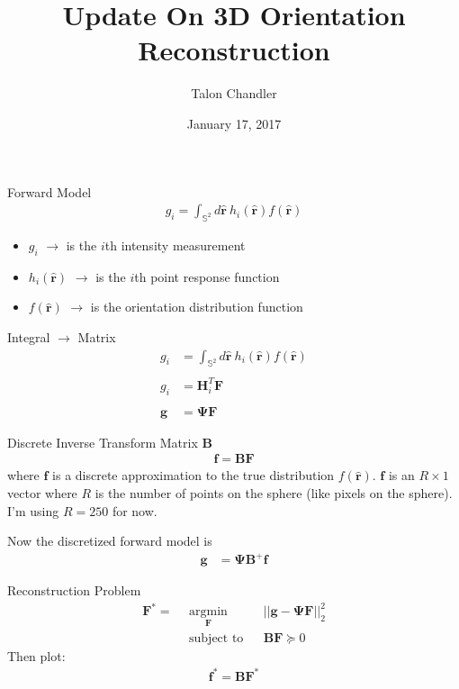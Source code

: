 \documentclass[presentation]{beamer}
\author{Talon Chandler}
\date{January 17, 2017}
\title{Update On 3D Orientation Reconstruction}
\begin{document}
\maketitle
\begin{frame}[label=sec-1]{Forward Model}
\begin{align*}
g_i = \int_{\mathbb{S}^2}d\hat{\textbf{r}}\ h_i(\hat{\textbf{r}})f(\hat{\textbf{r}})
\end{align*}
\begin{itemize}
\item $g_i$ $\rightarrow$ is the $i$th intensity measurement
\item $h_i(\hat{\textbf{r}})$ $\rightarrow$ is the $i$th point response function
\item $f(\hat{\textbf{r}})$ $\rightarrow$ is the orientation distribution function
\end{itemize}
\end{frame}

\begin{frame}{Integral $\rightarrow$ Matrix}
  \begin{align*}
  g_i &= \int_{\mathbb{S}^2}d\hat{\textbf{r}}\ h_i(\hat{\textbf{r}})f(\hat{\textbf{r}})\\ \\
  g_i &= \textbf{H}_i^T\textbf{F}\\ \\
  \mathbf{g} &= \mathbf{\Psi}\textbf{F}
  \end{align*}
\end{frame}

\begin{frame}{Discrete Inverse Transform Matrix $\mathbf{B}$}
  \begin{align*}
    \mathbf{f} = \mathbf{B}\mathbf{F}
  \end{align*}
  where $\mathbf{f}$ is a discrete approximation to the true distribution
  $f(\hat{\textbf{r}})$. $\mathbf{f}$ is an $R\times 1$ vector where $R$ is
  the number of points on the sphere (like pixels on the sphere). I'm using $R=250$ for now. \vspace{3em}

  Now the discretized forward model is 
  \begin{align*}
    \mathbf{g} &= \mathbf{\Psi}\mathbf{B}^{+}\mathbf{f}
  \end{align*}
\end{frame}

\begin{frame}{Reconstruction Problem}
  \begin{equation*}
    \begin{aligned}
      \mathbf{F^*} =\ \  
    & \underset{\mathbf{F}}{\text{argmin}}
    & & ||\mathbf{g} - \mathbf{\Psi}\mathbf{F}||_2^2 \\
    & \text{subject to}
    & & \mathbf{B}\mathbf{F} \succeq 0
    \end{aligned}
  \end{equation*}
  Then plot:
  \begin{align*}
    \mathbf{f}^{*} = \mathbf{B}\mathbf{F}^*
  \end{align*}
\end{frame}
\end{document}
